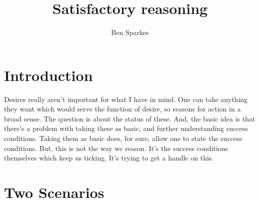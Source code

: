 \documentclass[10pt]{article}
\title{Satisfactory reasoning} %
\author{Ben Sparkes}
\begin{document}
\maketitle


\section{Introduction}
\label{sec:introduction}

{\color{red}
  Desires really aren't important for what I have in mind.
  One can take anything they want which would serve the function of desire, so reasons for action in a broad sense.
  The question is about the status of these.
  And, the basic idea is that there's a problem with taking these as basic, and further understanding success conditions.
  Taking them as basic does, for sure, allow one to state the success conditions.
  But, this is not the way we reason.
  It's the success conditions themselves which keep us ticking.
  It's trying to get a handle on this.
}

\section{Two Scenarios}
\label{sec:scenarios}

\begin{quote}

\end{quote}
\end{document}
